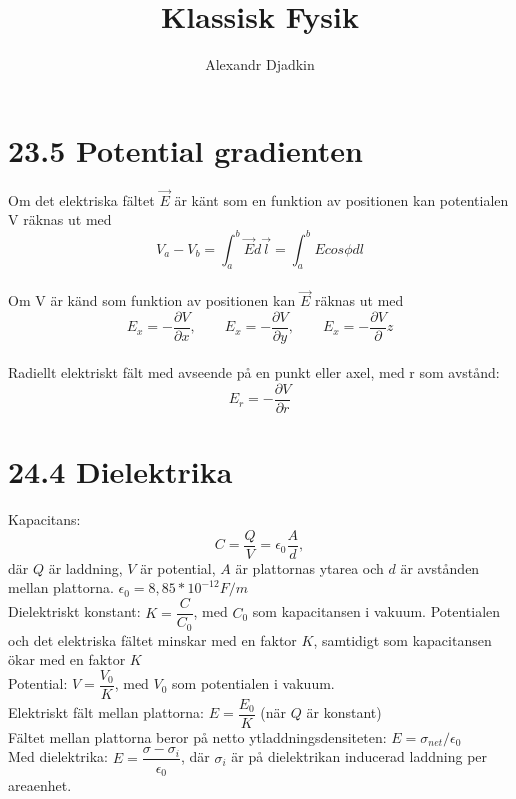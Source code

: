 \documentclass[a4paper]{article}
\title{Klassisk Fysik}
\author{Alexandr Djadkin}
\begin{document}
\maketitle




\section*{23.5 Potential gradienten}

Om det elektriska fältet $\vec{E}$ är känt som en funktion av positionen kan potentialen V räknas ut med  
\\[2mm]
\begin{equation}
V_a - V_b = \int_{a}^{b} \vec{E} d\vec{l} = \int_{a}^{b} Ecos\phi dl
\end{equation}
\\[2mm]
Om V är känd som funktion av positionen kan $\vec{E}$ räknas ut med 
\\[2mm]
\begin{equation}
E_x = -\dfrac{\partial V}{\partial x}, \qquad E_x = -\dfrac{\partial V}{\partial y}, \qquad E_x = -\dfrac{\partial V}{\partial} z
\end{equation}
\\[2mm]
Radiellt elektriskt fält med avseende på en punkt eller axel, med r som avstånd:
\begin{equation}
E_r = -\dfrac{\partial V}{\partial r}
\end{equation}


\section*{24.4 Dielektrika}

Kapacitans: \begin{equation}
C = \dfrac{Q}{V}=\epsilon_0\dfrac{A}{d},
\end{equation} där $Q$ är laddning, $V$ är potential, $A$ är plattornas ytarea och $d$ är avstånden mellan plattorna. $\epsilon_0 = 8,85*10^{-12} F/m$
\\[2mm]
Dielektriskt konstant: $K = \dfrac{C}{C_0}$, med $C_0$ som kapacitansen i vakuum. Potentialen och det elektriska fältet minskar med en faktor $K$, samtidigt som kapacitansen ökar med en faktor $K$
\\[2mm]
Potential: $V = \dfrac{V_0}{K}$, med $V_0$ som potentialen i vakuum.
\\[2mm]
Elektriskt fält mellan plattorna: $E = \dfrac{E_0}{K}$ (när $Q$ är konstant)
\\[1mm]
Fältet mellan plattorna beror på netto ytladdningsdensiteten: 
$E=\sigma_{net}/\epsilon_0$
\\[1mm]
Med dielektrika: $E = \dfrac{\sigma - \sigma_i}{\epsilon_0}$, där $\sigma_i$ är på dielektrikan inducerad laddning per areaenhet.
\newpage
\end{document}
